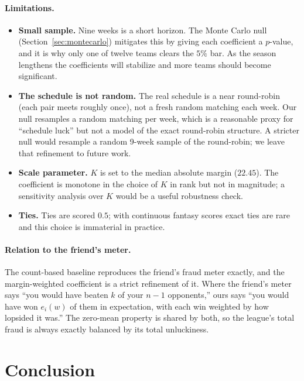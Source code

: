 \documentclass[11pt]{article}
\begin{document}
\paragraph{Limitations.}
\begin{itemize}[leftmargin=*,itemsep=2pt]
\item \textbf{Small sample.} Nine weeks is a short horizon. The Monte Carlo
null (Section~\ref{sec:montecarlo}) mitigates this by giving each coefficient
a $p$-value, and it is why only one of twelve teams clears the $5\%$ bar. As
the season lengthens the coefficients will stabilize and more teams should
become significant.
\item \textbf{The schedule is not random.} The real schedule is a near
round-robin (each pair meets roughly once), not a fresh random matching each
week. Our null resamples a random matching per week, which is a reasonable
proxy for ``schedule luck'' but not a model of the exact round-robin
structure. A stricter null would resample a random 9-week sample of the
round-robin; we leave that refinement to future work.
\item \textbf{Scale parameter.} $K$ is set to the median absolute margin
($22.45$). The coefficient is monotone in the choice of $K$ in rank but not in
magnitude; a sensitivity analysis over $K$ would be a useful robustness check.
\item \textbf{Ties.} Ties are scored $0.5$; with continuous fantasy scores
exact ties are rare and this choice is immaterial in practice.
\end{itemize}

\paragraph{Relation to the friend's meter.}
The count-based baseline reproduces the friend's fraud meter exactly, and the
margin-weighted coefficient is a strict refinement of it. Where the friend's
meter says ``you would have beaten $k$ of your $n-1$ opponents,'' ours says
``you would have won $e_i(w)$ of them in expectation, with each win weighted
by how lopsided it was.'' The zero-mean property is shared by both, so the
league's total fraud is always exactly balanced by its total unluckiness.

\section{Conclusion}
\label{sec:conclusion}
\end{document}
